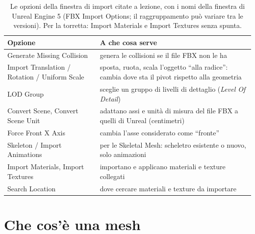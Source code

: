 \begin{table}[htbp]
\centering
\small
\begin{tabular}{@{}p{4.2cm}p{8.8cm}@{}}
\toprule
\textbf{Opzione} & \textbf{A che cosa serve} \\
\midrule
Generate Missing Collision & genera le collisioni se il file FBX non le ha \\
Import Translation / Rotation / Uniform Scale & sposta, ruota, scala l'oggetto ``alla
  radice'': cambia dove sta il pivot rispetto alla geometria \\
LOD Group & sceglie un gruppo di livelli di dettaglio (\emph{Level Of Detail}) \\
Convert Scene, Convert Scene Unit & adattano assi e unità di misura del file FBX a
  quelli di Unreal (centimetri) \\
Force Front X Axis & cambia l'asse considerato come ``fronte'' \\
Skeleton / Import Animations & per le Skeletal Mesh: scheletro esistente o nuovo, solo
  animazioni \\
Import Materials, Import Textures & importano e applicano materiali e texture
  collegati \\
Search Location & dove cercare materiali e texture da importare \\
\bottomrule
\end{tabular}
\caption{Le opzioni della finestra di import citate a lezione, con i nomi della
finestra di Unreal Engine 5 (FBX Import Options; il raggruppamento può variare tra le
versioni). Per la torretta: Import Materials e Import Textures senza spunta.}
\label{ue3:tab:import}
\end{table}

\section{Che cos'è una mesh}
\label{ue3:sec:mesh}

